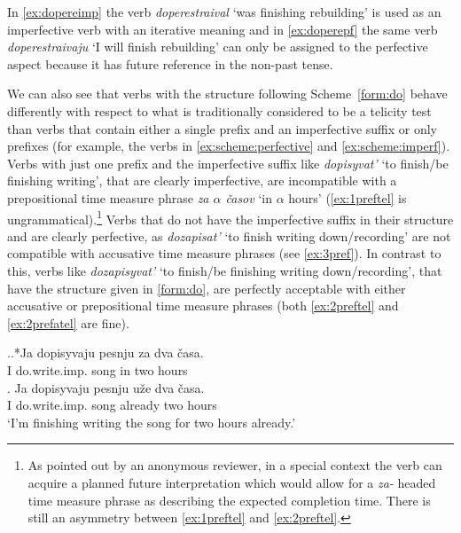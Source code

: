 In \ref{ex:dopereimp} the verb \textit{doperestraival} `was finishing rebuilding' is used as an imperfective verb  with an iterative meaning   and in \ref{ex:doperepf} the same verb \textit{doperestraivaju} `I will finish rebuilding' can only be assigned to the perfective aspect because it has future  reference in the non-past  tense.

We can also see that verbs with the structure following Scheme~\ref{form:do} behave differently with respect to what is traditionally considered to be a telicity test than verbs that contain either a single prefix and an imperfective suffix   or only prefixes (for example, the verbs in \ref{ex:scheme:perfective} and \ref{ex:scheme:imperf}). Verbs with just one prefix and the imperfective suffix   like \textit{dopisyvat'} `to finish/be finishing writing', that are clearly imperfective, are incompatible with a prepositional time measure phrase   \textit{za $\alpha$ \v{c}asov} `in $\alpha$ hours' (\ref{ex:1preftel} is ungrammatical).\footnote{As pointed out by an anonymous reviewer, in a special context   the verb can acquire a planned future  interpretation which would allow for a \textit{za-}  headed time measure phrase  as describing the expected completion time. There is still an asymmetry between \ref{ex:1preftel} and \ref{ex:2preftel}.} Verbs that do not have the imperfective suffix   in their structure and are clearly perfective, as \textit{dozapisat'} `to finish writing down/recording' are not compatible with accusative time measure phrases  (see \ref{ex:3pref}). In contrast to this, verbs like \textit{dozapisyvat'} `to finish/be finishing writing down/recording', that have the structure given in \ref{form:do}, are perfectly acceptable with either accusative or prepositional time measure phrases (both \ref{ex:2preftel} and \ref{ex:2prefatel} are fine).

\ex.\label{ex:1pref}\ag.*Ja dopisyvaju pesnju za dva \v{c}asa.\label{ex:1preftel}\\
I do.write.imp. song in two hours\\
\bg. \label{ex:1prefatel}Ja dopisyvaju pesnju u\v{z}e dva \v{c}asa.\\
I do.write.imp. song already two hours\\
\trans `I'm finishing writing the song for two hours already.'

